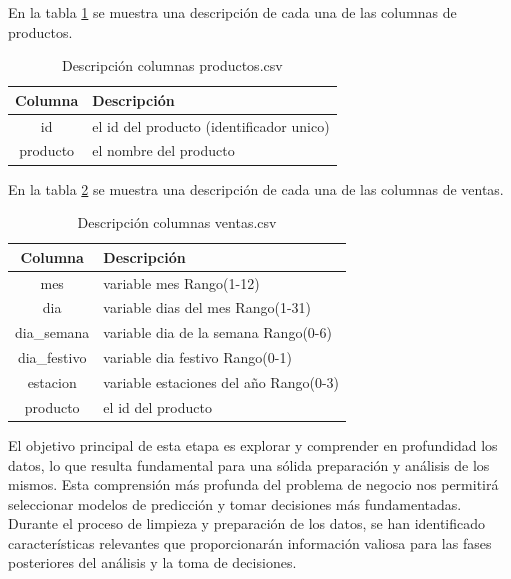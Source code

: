 En la tabla \ref{tab:productos} se muestra una descripción de cada una de las columnas de productos.

\begin{table}[H]

  \begin{tabular}{|c|l|}  %
    \hline
    \rowcolor{gray!50} \textbf{Columna} & \textbf{Descripción} \\
    \hline
    id &  el id del producto (identificador unico)\\
    producto & el nombre del producto \\
    \hline
  \end{tabular}
  \centering
  \caption{ Descripción columnas productos.csv}
  \label{tab:productos} %
\end{table}

  En la tabla \ref{tab:ventas} se muestra una descripción de cada una de las columnas de ventas.
  \begin{table}[H]
  \begin{tabular}{|c|l|}  %
    \hline
    \rowcolor{gray!50} \textbf{Columna} & \textbf{Descripción} \\
    \hline
    mes &  variable mes Rango(1-12)\\
    dia & variable dias del mes Rango(1-31)\\
    dia\_semana & variable dia de la semana Rango(0-6)\\
    dia\_festivo & variable dia festivo Rango(0-1)\\
    estacion & variable estaciones del año Rango(0-3)\\
    producto & el id del producto\\
    \hline
  \end{tabular}
  \centering
  \caption{ Descripción columnas ventas.csv}
  \label{tab:ventas} %
\end{table}

El objetivo principal de esta etapa es explorar y comprender en profundidad los datos, lo que resulta fundamental para una sólida preparación y análisis de los mismos. Esta comprensión más profunda del problema de negocio nos permitirá seleccionar modelos de predicción y tomar decisiones más fundamentadas. Durante el proceso de limpieza y preparación de los datos, se han identificado características relevantes que proporcionarán información valiosa para las fases posteriores del análisis y la toma de decisiones.

